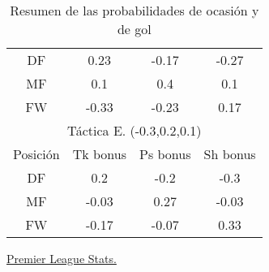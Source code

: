 \documentclass[a4paper,9pt]{article}
\begin{document}
\begin{table}
\begin{center}
\begin{tabular}{c c c c}
      \hline
      DF & 0.23 & -0.17 & -0.27 \\
      MF & 0.1 & 0.4 & 0.1 \\
      FW & -0.33 & -0.23 & 0.17 \\
      \hline\hline
      \multicolumn{4}{c}{Táctica E. (-0.3,0.2,0.1)}\\
      \hline
      Posición & Tk bonus & Ps bonus & Sh bonus\\
      \hline
      DF & 0.2 & -0.2 & -0.3 \\
      MF & -0.03 & 0.27 & -0.03 \\
      FW & -0.17 & -0.07 & 0.33 \\
      \hline\hline
    \end{tabular}
  \end{center}
  \caption{Resumen de las probabilidades de ocasión y de gol}
  \label{table:tacticbonus}
\end{table}

\newpage
\begin{thebibliography}{999}

  \href{https://www.whoscored.com/Regions/252/Tournaments/2/Seasons/7361/Stages/16368/TeamStatistics/England-Premier-League-2018-2019}{Premier League Stats.}
\end{thebibliography}
\end{document}
